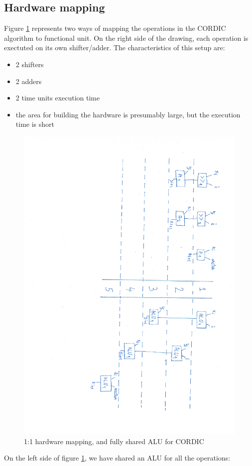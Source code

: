 \documentclass[12pt, a4paper,oneside]{article}
\begin{document}
\subsection{Hardware mapping} \label{hw_mapping}
Figure \ref{fig:schedules} represents two ways of mapping the operations in the
CORDIC algorithm to functional unit. On the right side of the drawing, each operation
is exectuted on its own shifter/adder. The characteristics of this setup are:

\begin{itemize}
	\item 2 shifters
	\item 2 adders
	\item 2 time units execution time
	\item the area for building the hardware is presumably large, but the execution time
	is short 
\end{itemize}


\begin{figure}[h]
	\centering
	\includegraphics[height = \textwidth,angle=91, trim=6.5cm 3.5cm 1.5cm 3cm, clip]{schedules.pdf}
	\caption{1:1 hardware mapping, and fully shared ALU for CORDIC}
	\label{fig:schedules}
\end{figure}

On the left side of figure \ref{fig:schedules}, we have shared an ALU for all the 
operations:
\end{document}
